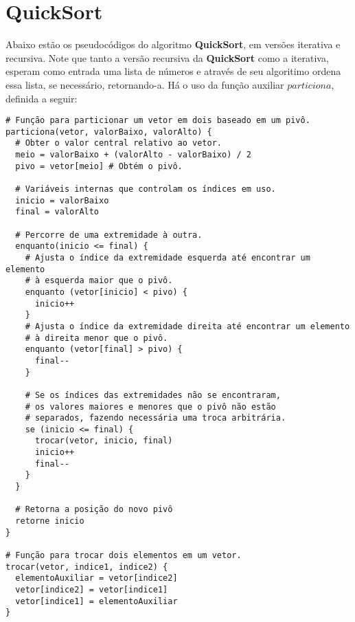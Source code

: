 \section{QuickSort}
Abaixo estão os pseudocódigos do algoritmo \textbf{QuickSort}, em versões iterativa e recursiva. Note que tanto a versão recursiva da \textbf{QuickSort} como a iterativa, esperam como entrada uma lista de números e através de seu algoritimo ordena essa lista, se necessário, retornando-a. Há o uso da função auxiliar $particiona$, definida a seguir:
\begin{verbatim}
# Função para particionar um vetor em dois baseado em um pivô.
particiona(vetor, valorBaixo, valorAlto) { 
  # Obter o valor central relativo ao vetor.
  meio = valorBaixo + (valorAlto - valorBaixo) / 2
  pivo = vetor[meio] # Obtém o pivô.

  # Variáveis internas que controlam os índices em uso.
  inicio = valorBaixo
  final = valorAlto 
  
  # Percorre de uma extremidade à outra.
  enquanto(inicio <= final) { 
    # Ajusta o índice da extremidade esquerda até encontrar um elemento 
    # à esquerda maior que o pivô.
    enquanto (vetor[inicio] < pivo) { 
      inicio++
    }
    # Ajusta o índice da extremidade direita até encontrar um elemento 
    # à direita menor que o pivô.
    enquanto (vetor[final] > pivo) {
      final--
    }

    # Se os índices das extremidades não se encontraram, 
    # os valores maiores e menores que o pivô não estão
    # separados, fazendo necessária uma troca arbitrária.
    se (inicio <= final) {
      trocar(vetor, inicio, final)
      inicio++
      final--
    }
  }
  
  # Retorna a posição do novo pivô
  retorne inicio
}
   
# Função para trocar dois elementos em um vetor.
trocar(vetor, indice1, indice2) { 
  elementoAuxiliar = vetor[indice2]
  vetor[indice2] = vetor[indice1]
  vetor[indice1] = elementoAuxiliar
}
\end{verbatim}





